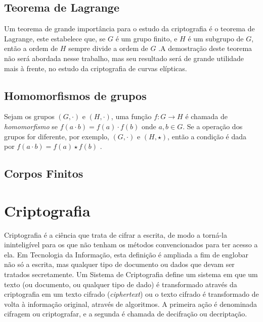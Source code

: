 \subsection{Teorema de Lagrange}

Um teorema de grande importância para o estudo da criptografia é o teorema de Lagrange, este estabelece que, se $G$ é um grupo finito, e $H$ é um subgrupo de $G$, então a ordem de $H$ sempre divide a ordem de $G$ \cite{Shoup:2005}.A demostração deste teorema não será abordada nesse trabalho, mas seu resultado será de grande utilidade mais à frente, no estudo da criptografia de curvas elípticas.

\subsection{Homomorfismos de grupos}

Sejam os grupos $(G, \cdot)$ e $(H, \cdot)$, uma função $f: G \rightarrow H$ é chamada de \textit{homomorfismo} se $f(a \cdot b) = f(a) \cdot f(b)$ onde $a, b \in G$. Se a operação dos grupos for diferente, por exemplo, $(G, \cdot)$ e $(H, \star)$, então a condição é dada por $f(a \cdot b) = f(a) \star f(b)$ \cite{Gilbert:2004}.



%
%
\subsection{Corpos Finitos}



%
%
\section{Criptografia} \label{sec:criptografia}
Criptografia é a ciência que trata de cifrar a escrita, de modo a torná-la ininteligível para os que não tenham os métodos convencionados para ter acesso a ela. Em Tecnologia da Informação, esta definição é ampliada a fim de englobar não só a escrita, mas qualquer tipo de documento ou dados que devam ser tratados secretamente. Um Sistema de Criptografia define um sistema em que um texto (ou documento, ou qualquer tipo de dado) é transformado através da criptografia em um texto cifrado (\textit{ciphertext}) ou o texto cifrado é transformado de volta à informação original, através de algoritmos. A primeira ação é denominada cifragem ou criptografar, e a segunda é chamada de decifração ou decriptação. \cite{Portnoi:2005}

